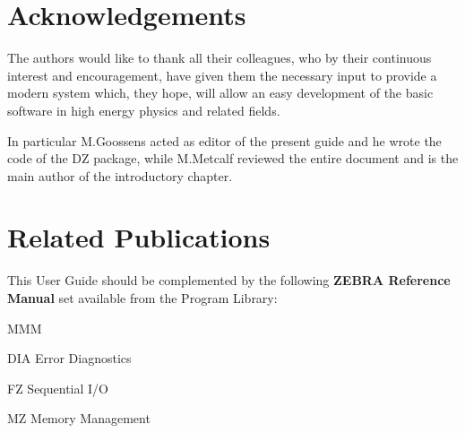 \section*{Acknowledgements}
\par The authors would like to thank all their colleagues, who by their
continuous interest and encouragement, have given them the
necessary input to provide a modern system which, they hope, will allow
an easy development of the basic software
in high energy physics and related fields.
\par In particular
M.Goossens acted as editor of the present guide and he wrote the code
of the DZ package, while
M.Metcalf reviewed the entire document and
is the main author of the introductory chapter.
\section*{Related Publications}
\par This User Guide should be complemented by the following
{\bf ZEBRA Reference Manual} set available from the
Program Library:
\begin{DL}{MMM}
\item[DIA]Error Diagnostics
\item[FZ]Sequential I/O
\item[MZ]Memory Management
\end{DL}
\tableofcontents
\listoffigures






\appendix

%

%

